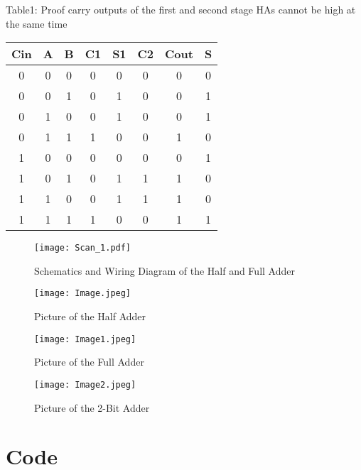 \documentclass[11pt]{article}
\begin{document}
\begin{center}
	\caption{Table1: Proof carry outputs of the first and second stage HAs cannot be high at the same time}
	\begin{tabular}{ccc|ccc|cc}
		\toprule
		Cin&A& B & C1 & S1 & C2 & Cout & S \\
		\midrule
		0&0&0&0&0&0&0&0 \\
		0&0&1&0&1&0&0&1 \\
		0&1&0&0&1&0&0&1 \\
		0&1&1&1&0&0&1&0 \\
	    1&0&0&0&0&0&0&1 \\
		1&0&1&0&1&1&1&0 \\
		1&1&0&0&1&1&1&0 \\
		1&1&1&1&0&0&1&1 \\
		\bottomrule
		\end{tabular}\medskip
	\end{center}
\begin{center}
	\begin{figure}
		\texttt{[image: Scan\_1.pdf]}
		\caption{Schematics and Wiring Diagram of the Half and Full Adder}
		\end{figure}
	\end{center}
\begin{center}
	\begin{figure}
		\texttt{[image: Image.jpeg]}
		\caption{Picture of the Half Adder}
	\end{figure}
\end{center}
\begin{center}
	\begin{figure}
		\texttt{[image: Image1.jpeg]}
		\caption{Picture of the Full Adder}
	\end{figure}
\end{center}
\begin{center}
	\begin{figure}
		\texttt{[image: Image2.jpeg]}
		\caption{Picture of the 2-Bit Adder}
	\end{figure}
\end{center}

\clearpage
\section*{Code}
\end{document}
